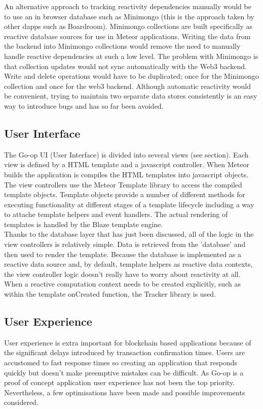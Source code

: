 An alternative approach to tracking reactivity dependencies manually would be to use an in browser database such as Minimongo (this is the approach taken by other dapps such as Boardroom). Minimongo collections are built specifically as reactive database sources for use in Meteor applications. Writing the data from the backend into Minimongo collections would remove the need to manually handle reactive dependencies at such a low level. The problem with Minimongo is that collection updates would not sync automatically with the Web3 backend. Write and delete operations would have to be duplicated; once for the Minimongo collection and once for the web3 backend. Although automatic reactivity would be convenient, trying to maintain two separate data stores consistently is an easy way to introduce bugs and has so far been avoided.\\

\subsection{User Interface}
The Go-op UI (User Interface) is divided into several views (see section). Each view is defined by a HTML template and a javascript controller. When Meteor builds the application is compiles the HTML templates into javascript objects. The view controllers use the Meteor Template library to access the compiled template objects. Template objects provide a number of different methods for executing functionality at different stages of a template lifecycle including a way to attache template helpers and event handlers. The actual rendering of templates is handled by the Blaze template engine. \\

Thanks to the database layer that has just been discussed, all of the logic in the view controllers is relatively simple. Data is retrieved from the 'database' and then used to render the template. Because the database is implemented as a reactive data source and, by default, template helpers as reactive data contexts, the view controller logic doesn't really have to worry about reactivity at all. When a reactive computation context needs to be created explicitly, such as within the template onCreated function, the Tracker library is used. \\

\subsection{User Experience}
User experience is extra important for blockchain based applications because of the significant delays introduced by transaction confirmation times. Users are accustomed to fast response times so creating an application that responds quickly but doesn't make preemptive mistakes can be difficult. As Go-op is a proof of concept application user experience has not been the top priority. Nevertheless, a few optimisations have been made and possible improvements considered.\\

